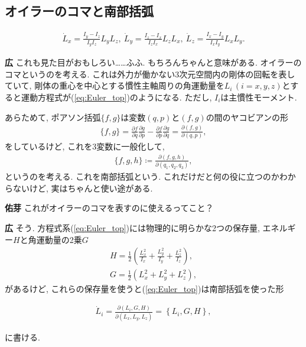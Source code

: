 \documentclass{ltjsarticle}
\theoremstyle{definition}
\newcommand{\parno}{\par\noindent}
\begin{document}
\subsection{オイラーのコマと南部括弧}
\begin{tcolorbox}
  \begin{align}
    \dot L_x=\frac{I_y-I_z}{I_yI_z}L_yL_z,\ \dot L_y=\frac{I_z-I_x}{I_zI_x}L_zL_x,\ \dot L_z=\frac{I_x-I_y}{I_xI_y}L_xL_y.\label{eq:Euler_top}
  \end{align}
\end{tcolorbox}
\parno
\textbf{広} これも見た目がおもしろい……ふふ.
もちろんちゃんと意味がある. オイラーのコマというのを考える. これは外力が働かない3次元空間内の剛体の回転を表していて, 剛体の重心を中心とする慣性主軸周りの角運動量を$L_i\,(i=x,y,z)$とすると運動方程式が(\ref{eq:Euler_top})のようになる. ただし, $I_i$は主慣性モーメント.
\par
あらためて, ポアソン括弧$\{f,g\}$は変数$(q,p)$と$(f,g)$の間のヤコビアンの形
\begin{align}
  \{f,g\}=\frac{\partial f}{\partial q}\frac{\partial g}{\partial p}-\frac{\partial f}{\partial p}\frac{\partial g}{\partial q}=\frac{\partial(f,g)}{\partial(q,p)},
\end{align}
をしているけど, これを3変数に一般化して,
\begin{align}
  \{f,g,h\}\coloneqq\frac{\partial(f,g,h)}{\partial(q_1,q_2,q_3)},
\end{align}
というのを考える. これを南部括弧という. これだけだと何の役に立つのかわからないけど, 実はちゃんと使い途がある.\parno
\textbf{佑芽} これがオイラーのコマを表すのに使えるってこと？\parno
\textbf{広} そう. 方程式系(\ref{eq:Euler_top})には物理的に明らかな2つの保存量, エネルギー$H$と角運動量の2乗$G$
\begin{gather}
  H=\frac12\left(\frac{L_x^2}{I_x}+\frac{L_y^2}{I_y}+\frac{L_z^2}{I_z}\right),\\
  G=\frac12\left(L_x^2+L_y^2+L_z^2\right),
\end{gather}
があるけど, これらの保存量を使うと(\ref{eq:Euler_top})は南部括弧を使った形
\begin{tcolorbox}
\begin{align}
  \dot L_i=\frac{\partial(L_i,G,H)}{\partial(L_x,L_y,L_z)}=\left\{L_i,G,H\right\},
\end{align}
\end{tcolorbox}
\parno
に書ける.
\end{document}

